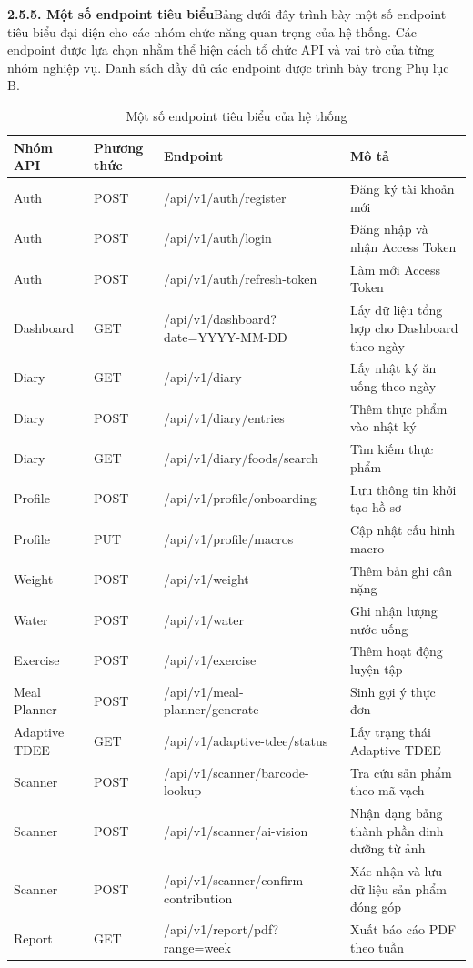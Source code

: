 \textbf{2.5.5. Một số endpoint tiêu biểu}Bảng dưới đây trình bày một số endpoint tiêu biểu đại diện cho các nhóm chức năng quan trọng của hệ thống. Các endpoint được lựa chọn nhằm thể hiện cách tổ chức API và vai trò của từng nhóm nghiệp vụ. Danh sách đầy đủ các endpoint được trình bày trong Phụ lục B.

\begin{table}[H]
\centering
\caption{Một số endpoint tiêu biểu của hệ thống}
\begin{tabular}{|p{3cm}|p{4cm}|p{4cm}|p{4cm}|}
\hline
\textbf{Nhóm API} & \textbf{Phương thức} & \textbf{Endpoint} & \textbf{Mô tả} \\ \hline
Auth & POST & /api/v1/auth/register & Đăng ký tài khoản mới \\ \hline
Auth & POST & /api/v1/auth/login & Đăng nhập và nhận Access Token \\ \hline
Auth & POST & /api/v1/auth/refresh-token & Làm mới Access Token \\ \hline
Dashboard & GET & /api/v1/dashboard?date=YYYY-MM-DD & Lấy dữ liệu tổng hợp cho Dashboard theo ngày \\ \hline
Diary & GET & /api/v1/diary & Lấy nhật ký ăn uống theo ngày \\ \hline
Diary & POST & /api/v1/diary/entries & Thêm thực phẩm vào nhật ký \\ \hline
Diary & GET & /api/v1/diary/foods/search & Tìm kiếm thực phẩm \\ \hline
Profile & POST & /api/v1/profile/onboarding & Lưu thông tin khởi tạo hồ sơ \\ \hline
Profile & PUT & /api/v1/profile/macros & Cập nhật cấu hình macro \\ \hline
Weight & POST & /api/v1/weight & Thêm bản ghi cân nặng \\ \hline
Water & POST & /api/v1/water & Ghi nhận lượng nước uống \\ \hline
Exercise & POST & /api/v1/exercise & Thêm hoạt động luyện tập \\ \hline
Meal Planner & POST & /api/v1/meal-planner/generate & Sinh gợi ý thực đơn \\ \hline
Adaptive TDEE & GET & /api/v1/adaptive-tdee/status & Lấy trạng thái Adaptive TDEE \\ \hline
Scanner & POST & /api/v1/scanner/barcode-lookup & Tra cứu sản phẩm theo mã vạch \\ \hline
Scanner & POST & /api/v1/scanner/ai-vision & Nhận dạng bảng thành phần dinh dưỡng từ ảnh \\ \hline
Scanner & POST & /api/v1/scanner/confirm-contribution & Xác nhận và lưu dữ liệu sản phẩm đóng góp \\ \hline
Report & GET & /api/v1/report/pdf?range=week & Xuất báo cáo PDF theo tuần \\ \hline
\end{tabular}
\end{table}

